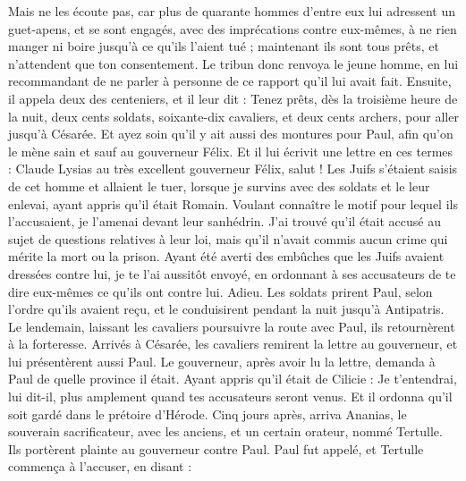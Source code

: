 \begin{multicols}{2}
Mais ne les écoute pas, car plus de quarante hommes d'entre eux lui adressent un guet-apens, et se sont engagés, avec des imprécations contre eux-mêmes, à ne rien manger ni boire jusqu'à ce qu'ils l'aient tué ; maintenant ils sont tous prêts, et n’attendent que ton consentement.
Le tribun donc renvoya le jeune homme, en lui recommandant de ne parler à personne de ce rapport qu’il lui avait fait.
Ensuite, il appela deux des centeniers, et il leur dit : Tenez prêts, dès la troisième heure de la nuit, deux cents soldats, soixante-dix cavaliers, et deux cents archers, pour aller jusqu’à Césarée.
Et ayez soin qu'il y ait aussi des montures pour Paul, afin qu’on le mène sain et sauf au gouverneur Félix.
Et il lui écrivit une lettre en ces termes :
Claude Lysias au très excellent gouverneur Félix, salut !
Les Juifs s’étaient saisis de cet homme et allaient le tuer, lorsque je survins avec des soldats et le leur enlevai, ayant appris qu’il était Romain.
Voulant connaître le motif pour lequel ils l'accusaient, je l’amenai devant leur sanhédrin.
J’ai trouvé qu’il était accusé au sujet de questions relatives à leur loi, mais qu’il n’avait commis aucun crime qui mérite la mort ou la prison.
Ayant été averti des embûches que les Juifs avaient dressées contre lui, je te l'ai aussitôt envoyé, en ordonnant à ses accusateurs de te dire eux-mêmes ce qu’ils ont contre lui. Adieu.
Les soldats prirent Paul, selon l’ordre qu’ils avaient reçu, et le conduisirent pendant la nuit jusqu’à Antipatris.
Le lendemain, laissant les cavaliers poursuivre la route avec Paul, ils retournèrent à la forteresse.
Arrivés à Césarée, les cavaliers remirent la lettre au gouverneur, et lui présentèrent aussi Paul.
Le gouverneur, après avoir lu la lettre, demanda à Paul de quelle province il était. Ayant appris qu'il était de Cilicie :
Je t'entendrai, lui dit-il, plus amplement quand tes accusateurs seront venus. Et il ordonna qu'il soit gardé dans le prétoire d'Hérode.
\VerseOne{}Cinq jours après, arriva Ananias, le souverain sacrificateur, avec les anciens, et un certain orateur, nommé Tertulle. Ils portèrent plainte au gouverneur contre Paul.
Paul fut appelé, et Tertulle commença à l'accuser, en disant :

\end{multicols}
